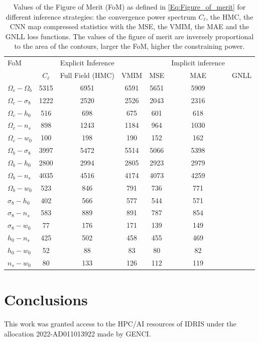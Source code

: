 \documentclass{aa}
\begin{document}
\begin{center}
\begin{table}
\caption{ Values of the Figure of Merit (FoM) as defined in \autoref{Eq:Figure_of_merit} for different inference strategies: the convergence power spectrum $C_{\ell}$, the HMC, the CNN map compressed statistics with the MSE, the VMIM, the MAE and the GNLL loss functions. The values of the figure of merit are inversely proportional to the area of the contours, larger the FoM, higher the constraining power.}
\begin{tabular}{lcccccc} 
 \hline
    FoM &  & Explicit Inference  &  & & Implicit inference  \\
     & $C_{\ell}$ & Full Field (HMC)&  VMIM & MSE & MAE & GNLL   \\
  \hline
 $\Omega_c-  \Omega_b$ & 5315 & 6951 & 6591 & 5651 & 5909\\
 $\Omega_c-  \sigma_8$ & 1222 & 2520 & 2526 & 2043 & 2316\\
 $\Omega_c-  h_0$      & 516  & 698  & 675  & 601  & 618\\
 $\Omega_c-  n_s$      & 898  & 1243 & 1184 & 964  & 1030\\
 $\Omega_c-  w_0$      & 100  & 198  & 190  & 152  & 162\\
 $\Omega_b-  \sigma_8$ & 3997 & 5472 & 5514 & 5066 & 5398\\
 $\Omega_b-  h_0$      & 2800 & 2994 & 2805 & 2923 & 2979\\
 $\Omega_b-  n_s$      & 4035 & 4516 & 4174 & 4073 & 4259\\
 $\Omega_b-  w_0$      & 523  & 846  & 791  & 736  & 771\\
 $\sigma_8-  h_0$      & 402  & 566  & 577  & 544  & 571\\
 $\sigma_8-  n_s$      & 583  & 889  & 891  & 787  & 854\\ 
 $\sigma_8-  w_0$      & 77   & 176  & 171  & 139  & 149\\
 $h_0-       n_s$      & 425  & 502  & 458  & 455  & 469\\
 $h_0-       w_0$      & 52   & 88   & 83   & 80   & 82\\
 $n_s-       w_0$      & 80   & 133  & 126  & 112  & 119\\
     \hline
\end{tabular}
\label{tab:f_o_m}
\end{table}
\end{center}
\section{Conclusions}
\begin{acknowledgements}
This work was granted access to the HPC/AI resources of IDRIS under the allocation 2022-AD011013922 made by GENCI.
\end{acknowledgements}
\end{document}
